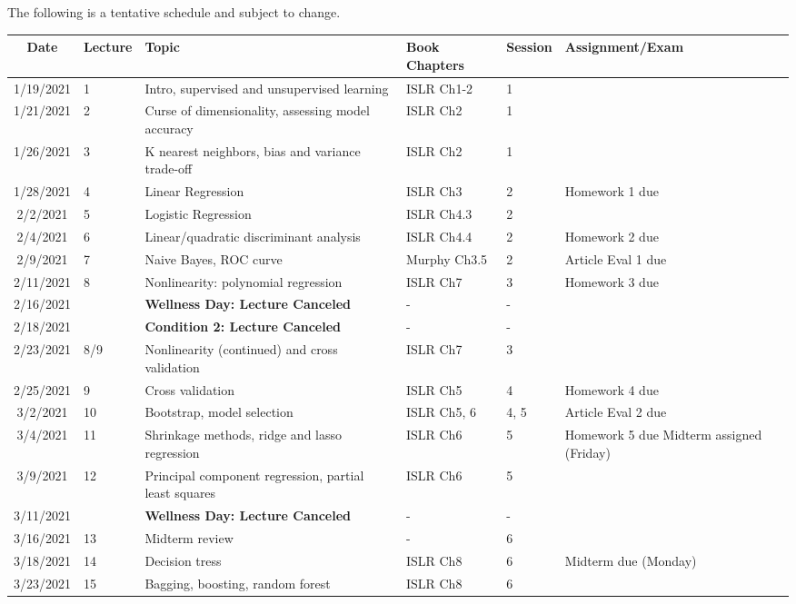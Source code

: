 \documentclass[11pt]{article}
\begin{document}
The following is a tentative schedule and subject to change.
\begin{center}
\begin{tabular}{c|m{3em}|m{21em}|m{7em}|m{3em}|m{8em}}
Date & Lecture & Topic & Book Chapters & Session & Assignment/Exam\\
\hline
1/19/2021 & 1 & Intro, supervised and unsupervised learning & ISLR Ch1-2 &  1 &  \\ \hline
1/21/2021 & 2 & Curse of dimensionality, assessing model accuracy & ISLR Ch2 &  1 &  \\ \hline
1/26/2021 & 3 & K nearest neighbors, bias and variance trade-off  & ISLR Ch2 &  1 &  \\ \hline
1/28/2021 & 4 & Linear Regression & ISLR Ch3 &  2 & Homework 1 due \\ \hline
2/2/2021 & 5 & Logistic Regression & ISLR Ch4.3 &  2 &  \\ \hline
2/4/2021 & 6 & Linear/quadratic discriminant analysis & ISLR Ch4.4 &  2 & Homework 2 due \\ \hline
2/9/2021 & 7 & Naive Bayes, ROC curve & Murphy Ch3.5 &  2 & Article Eval 1 due \\ \hline
2/11/2021 & 8 & Nonlinearity: polynomial regression & ISLR Ch7 & 3 & Homework 3 due \\ \hline
2/16/2021 &  & \textbf{Wellness Day: Lecture Canceled} & - & - & \\ \hline
2/18/2021 &  & \textbf{Condition 2: Lecture Canceled} & - &  - & \\ \hline
2/23/2021 & 8/9 & Nonlinearity (continued) and cross validation & ISLR Ch7 & 3 \\ \hline
2/25/2021 & 9 & Cross validation & ISLR Ch5 & 4 & Homework 4 due \\ \hline
3/2/2021 & 10 & Bootstrap, model selection & ISLR Ch5, 6 & 4, 5 & Article Eval 2 due\\ \hline
3/4/2021 & 11 & Shrinkage methods, ridge and lasso regression & ISLR Ch6 & 5 & Homework 5 due Midterm assigned (Friday) \\ \hline
3/9/2021 & 12 & Principal component regression, partial least squares & ISLR Ch6 & 5 & \\ \hline
3/11/2021 &  & \textbf{Wellness Day: Lecture Canceled} & - & - & \\ \hline
3/16/2021 & 13 & Midterm review & - & 6 & \\ \hline
3/18/2021 & 14 & Decision tress & ISLR Ch8 & 6 & Midterm due (Monday)\\ \hline
3/23/2021 & 15 & Bagging, boosting, random forest & ISLR Ch8 & 6 & \\ \hline

\end{tabular}
\end{center}
\end{document}
